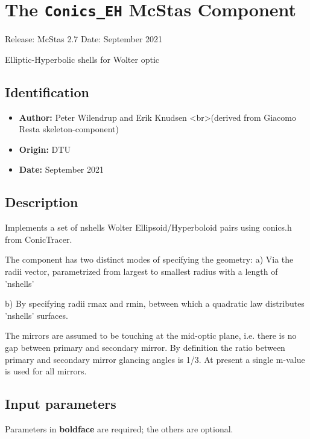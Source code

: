 \section{The \texttt{Conics\_EH} McStas Component}
Release: McStas 2.7
Date: September 2021

Elliptic-Hyperbolic shells for Wolter optic

\subsection*{Identification}
\begin{itemize}
  \item \textbf{Author:} Peter Wilendrup and Erik Knudsen \textless{}br\textgreater{}(derived from Giacomo Resta skeleton-component)
  \item \textbf{Origin:} DTU
  \item \textbf{Date:} September 2021
\end{itemize}

\subsection*{Description}
Implements a set of nshells Wolter Ellipsoid/Hyperboloid pairs using conics.h from ConicTracer.

The component has two distinct modes of specifying the geometry: a) Via the radii vector, parametrized from largest to smallest radius with a length of 'nshells'

b) By specifying radii rmax and rmin, between which a quadratic law distributes 'nshells' surfaces.

The mirrors are assumed to be touching at the mid-optic plane, i.e. there is no gap between primary and secondary mirror. By definition the ratio between primary and secondary mirror glancing angles is 1/3. At present a single m-value is used for all mirrors.

\subsection*{Input parameters}
Parameters in \textbf{boldface} are required; the others are optional.

